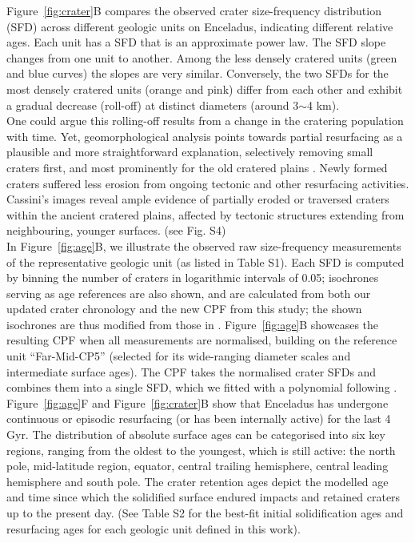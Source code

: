 \documentclass[preprint,12pt,3p,times,authoryear]{elsarticle}
\begin{document}
Figure~\ref{fig:crater}B compares the observed crater size-frequency distribution (SFD) across different geologic units on Enceladus, indicating different relative ages. Each unit has a SFD that is an approximate power law. The SFD slope changes from one unit to another. Among the less densely cratered units (green and blue curves) the slopes are very similar. Conversely, the two SFDs for the most densely cratered units (orange and pink) differ from each other and exhibit a gradual decrease (roll-off) at distinct diameters (around 3$\sim$4 km).\\

One could argue this rolling-off results from a change in the cratering population with time. Yet, geomorphological analysis points towards partial resurfacing as a plausible and more straightforward explanation, selectively removing small craters first, and most prominently for the old cratered plains \citep{Michael2010}. Newly formed craters suffered less erosion from ongoing tectonic and other resurfacing activities. Cassini’s images reveal ample evidence of partially eroded or traversed craters within the ancient cratered plains, affected by tectonic structures extending from neighbouring, younger surfaces. (see Fig. S4)\\

In Figure~\ref{fig:age}B, we illustrate the observed raw size-frequency measurements of the representative geologic unit (as listed in Table S1). Each SFD is computed by binning the number of craters in logarithmic intervals of 0.05; isochrones serving as age references are also shown, and are calculated from both our updated crater chronology and the new CPF from this study; the shown isochrones are thus modified from those in \citet{Wong2023}. Figure~\ref{fig:age}B showcases the resulting CPF when all measurements are normalised, building on the reference unit ``Far-Mid-CP5'' (selected for its wide-ranging diameter scales and intermediate surface ages). The CPF takes the normalised crater SFDs and combines them into a single SFD, which we fitted with a polynomial following \citet{Neukum2001}. \\

Figure~\ref{fig:age}F and Figure~\ref{fig:crater}B show that Enceladus has undergone continuous or episodic resurfacing (or has been internally active) for the last 4 Gyr. The distribution of absolute surface ages can be categorised into six key regions, ranging from the oldest to the youngest, which is still active: the north pole, mid-latitude region, equator, central trailing hemisphere, central leading hemisphere and south pole. The crater retention ages depict the modelled age and time since which the solidified surface endured impacts and retained craters up to the present day. (See Table S2 for the best-fit initial solidification ages and resurfacing ages for each geologic unit defined in this work).
\end{document}
